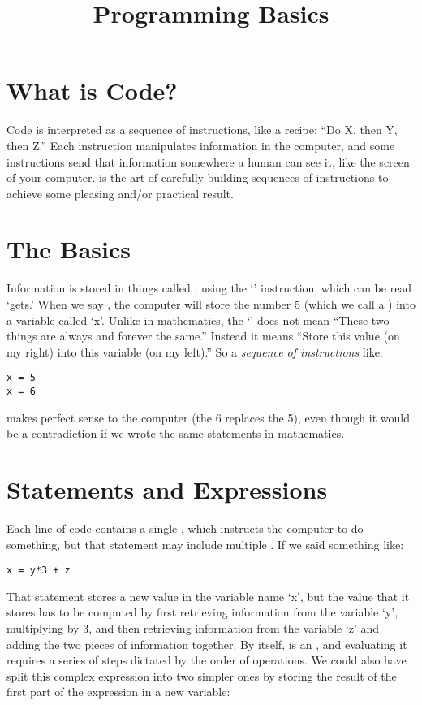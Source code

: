 \documentclass{handout}
\title{Programming Basics}
\begin{document}
\lstset{language=Python}

\section{What is Code?}

Code is interpreted as a sequence of instructions, like a recipe: ``Do X, then Y, then Z.''
%
Each instruction manipulates information in the computer, and some instructions send that information somewhere a human can see it, like the screen of your computer.
%
 is the art of carefully building sequences of instructions to achieve some pleasing and/or practical result.

\section{The Basics}

Information is stored in things called , using the `\code{=}' instruction, which can be read `gets.' When we say , the computer will store the number 5 (which we call a ) into a variable called `x'. Unlike in mathematics, the `\code{=}' does not mean ``These two things are always and forever the same.'' Instead it means ``Store this value (on my right) into this variable (on my left).'' So a \emph{sequence of instructions} like:
\begin{lstlisting}
x = 5
x = 6
\end{lstlisting}
makes perfect sense to the computer (the 6 replaces the 5), even though it would be a contradiction if we wrote the same statements in mathematics.


\section{Statements and Expressions}

Each line of code contains a single , which instructs the computer to do something, but that statement may include multiple . If we said something like:

\begin{lstlisting}
x = y*3 + z
\end{lstlisting}

That statement stores a new value in the variable name `x', but the value that it stores has to be computed by first retrieving information from the variable `y', multiplying by 3, and then retrieving information from the variable `z' and adding the two pieces of information together. By itself,  is an , and evaluating it requires a series of steps dictated by the order of operations. We could also have split this complex expression into two simpler ones by storing the result of the first part of the expression in a new variable:
\end{document}

